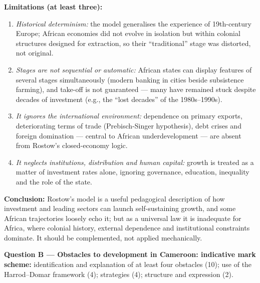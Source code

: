 \documentclass[11pt]{article}
\begin{document}
\begin{corrige}
\textbf{Limitations (at least three):}
\begin{enumerate}
\item \emph{Historical determinism:} the model generalises the experience of 19th-century Europe; African economies did not evolve in isolation but within colonial structures designed for extraction, so their ``traditional'' stage was distorted, not original.
\item \emph{Stages are not sequential or automatic:} African states can display features of several stages simultaneously (modern banking in cities beside subsistence farming), and take-off is not guaranteed — many have remained stuck despite decades of investment (e.g., the ``lost decades'' of the 1980s--1990s).
\item \emph{It ignores the international environment:} dependence on primary exports, deteriorating terms of trade (Prebisch-Singer hypothesis), debt crises and foreign domination — central to African underdevelopment — are absent from Rostow's closed-economy logic.
\item \emph{It neglects institutions, distribution and human capital:} growth is treated as a matter of investment rates alone, ignoring governance, education, inequality and the role of the state.
\end{enumerate}

\textbf{Conclusion:} Rostow's model is a useful pedagogical description of how investment and leading sectors can launch self-sustaining growth, and some African trajectories loosely echo it; but as a universal law it is inadequate for Africa, where colonial history, external dependence and institutional constraints dominate. It should be complemented, not applied mechanically.

\medskip
\textbf{Question B — Obstacles to development in Cameroon: indicative mark scheme:} identification and explanation of at least four obstacles (10); use of the Harrod--Domar framework (4); strategies (4); structure and expression (2).


\end{corrige}
\end{document}
